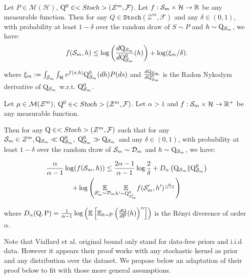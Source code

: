 \begin{noaddcontents}
\begin{proposition}
\label{prop: rivasplata_disintegrated}
 Let $P \in \mathcal{M}(\mathcal{H})$, $\mathrm{Q}^{0} \in <Stoch>(\mathcal{Z}^m,\mathcal{F})$. Let $f: \mathcal{S}_m \times \mathcal{H} \rightarrow \mathbb{R}$ be any measurable function.
Then for any $Q \in \texttt{Stoch}(\mathcal{Z}^m,\mathcal{F})$ and any $\delta \in(0,1)$, with probability at least $1-\delta$ over the random draw of $S \sim P$ and $h\sim \mathrm{Q}_{\mathcal{S}_m}$, we have:
$$
f(\mathcal{S}_m,h) \leq \log\left(\frac{d\mathrm{Q}_{\mathcal{S}_m}}{d\mathrm{Q}_{\mathcal{S}_m}^{0}}(h) \right)+\log (\xi_m / \delta) .
$$

where $\xi_m:=\int_{\mathcal{S}_m} \int_{\mathcal{H}} e^{f(s, h)} \mathrm{Q}_{\mathcal{S}_m}^{0}(d h) P(d s)$ and $\frac{d\mathrm{Q}_{\mathcal{S}_m}}{d\mathrm{Q}_{\mathcal{S}_m}^{0}}$ is the Radon Nykodym derivative of $\mathrm{Q}_{\mathcal{S}_m}$ w.r.t. $\mathrm{Q}_{\mathcal{S}_m}^0$.
\end{proposition}


\begin{proposition}
  \label{prop: viallard_disintegrated}
   Let $\mu \in \mathcal{M}(\mathcal{Z}^m)$, $\mathrm{Q}^{0} \in <Stoch>(\mathcal{Z}^m,\mathcal{F})$. Let  $\alpha>1$ and  $f: \mathcal{S}_m \times \mathcal{H} \rightarrow \mathbb{R}^+$ be any measurable function.

   Then for any $\mathrm{Q} \in <Stoch>(\mathcal{Z}^m,\mathcal{F})$ such that for any $\mathcal{S}_m\in\mathcal{Z}^m, \mathrm{Q}_{\mathcal{S}_m}\ll\mathrm{Q}_{\mathcal{S}_m}^0,\; \mathrm{Q}_{\mathcal{S}_m}^0\gg\mathrm{Q}_{\mathcal{S}_m} $ and any $\delta \in(0,1)$, with probability at least $1-\delta$ over the random draw of $\mathcal{S}_m \sim \mathcal{D}_{m}$ and $h\sim \mathrm{Q}_{\mathcal{S}_m}$, we have:

  \begin{multline*}
    \frac{\alpha}{\alpha-1} \log (f(\mathcal{S}_m,h)) \leq \frac{2 \alpha-1}{\alpha-1} \log \frac{2}{\delta}+D_{\alpha}\left(\mathrm{Q}_{\mathcal{S}_m} \| \mathrm{Q}_{\mathcal{S}_m}^0\right)\\
    +
   \log \left(\underset{\mathcal{S}_m^{\prime} \sim \mathcal{D}_{m}}{\mathbb{E}} \underset{h^{\prime} \sim \mathrm{Q}_{\mathcal{S}_m'}^0}{\mathbb{E}}
   f(\mathcal{S}_m',h')^{\frac{\alpha}{\alpha-1}}\right) 
  \end{multline*}

   where $D_\alpha(\mathrm{Q},\mathrm{P})= \frac{1}{\alpha-1}\log\left( \mathbb{E}\left[ \mathbb{E}_{h\sim \mathrm{P}} \left(\frac{d\mathrm{Q}}{d\mathrm{P}}(h)\right)^\alpha   \right] \right)$ is the Rényi diverence of order $\alpha$.

\end{proposition}

Note that Viallard et al. original bound only stand for data-free priors and i.i.d data. However it appears their proof works with any stochastic kernel as prior and any distribution over the dataset. We propose below an adaptation of their proof below to fit with those more general assumptions.



\end{noaddcontents}
